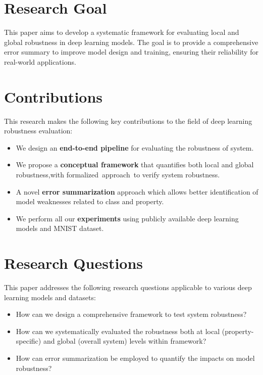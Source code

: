 \documentclass[10pt, conference, a4paper, final]{IEEEtran}
\begin{document}
\section{Research Goal}
This paper aims to develop a systematic framework for evaluating local and global robustness in deep learning models. 
The goal is to provide a comprehensive error summary to improve model design and training, ensuring their reliability for real-world applications.

\section{Contributions}
This research makes the following key contributions to the field of deep learning robustness evaluation:
\begin{itemize}
   
    \item We design an \textbf{end-to-end pipeline} for evaluating the robustness of system.
    
    \item We propose a \textbf{conceptual framework} that quantifies both local and global robustness,with formalized approach to verify system robustness.
    \item A novel \textbf{error summarization}  approach which allows better identification of model weaknesses related to class and property.

    \item We perform all our \textbf{experiments} using publicly available deep learning models and MNIST dataset.
\end{itemize}

\section{Research Questions}

This paper addresses the following research questions applicable to various deep learning models and datasets:

\begin{itemize}
    \item How can we design a comprehensive framework to test system robustness?
    \item How can we systematically evaluated the robustness both at local (property-specific) and global (overall system) levels within framework?
    \item How can error summarization be employed to quantify the impacts on model robustness?
 
\end{itemize}
\end{document}

